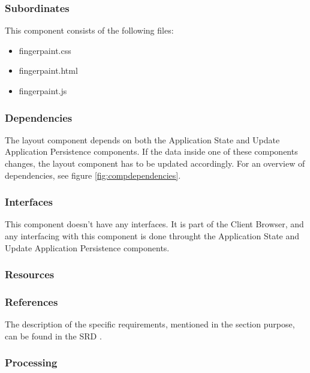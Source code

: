 \subsubsection*{Subordinates}
This component consists of the following files:
\begin{itemize}
\item fingerpaint.css
\item fingerpaint.html
\item fingerpaint.js
\end{itemize}

\subsubsection*{Dependencies}
The layout component depends on both the Application State and Update Application Persistence components. If the data inside one of these components changes, the layout component has to be updated accordingly. For an overview of dependencies, see figure \ref{fig:compdependencies}.

\subsubsection*{Interfaces}
This component doesn't have any interfaces. It is part of the Client Browser, and any interfacing with this component is done throught the Application State and Update Application Persistence components.

\subsubsection*{Resources}

\subsubsection*{References}
The description of the specific requirements, mentioned in the section purpose, can be found in the SRD \cite{srd}.

\subsubsection*{Processing}

